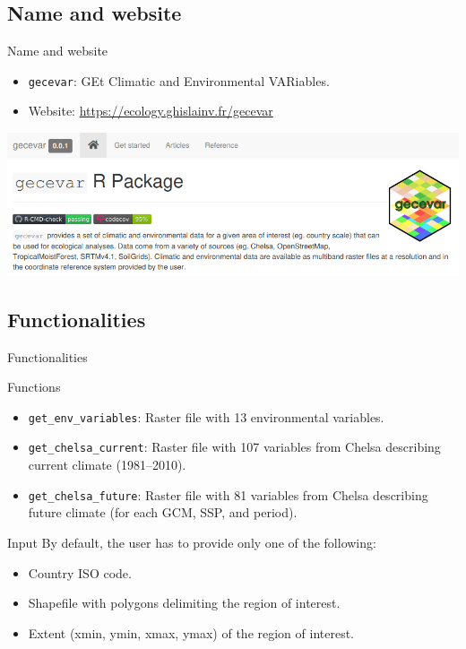\documentclass[10pt,table,dvipsnames,compress]{beamer}
\begin{document}
\subsection{Name and website}
\label{sec:orgb40b0ad}

\begin{frame}[label={sec:orgeaef01e},fragile]{Name and website}
 \begin{itemize}
\item \texttt{gecevar}: GEt Climatic and Environmental VARiables.
\item Website: \url{https://ecology.ghislainv.fr/gecevar}
\end{itemize}

\begin{center}
\includegraphics[width=\textwidth]{figs/gecevar-website.png}
\end{center}
\end{frame}

\subsection{Functionalities}
\label{sec:org6fc9dc9}

\begin{frame}[label={sec:org66afcc2},fragile]{Functionalities}
 \begin{block}{Functions}
\begin{itemize}
\item \texttt{get\_env\_variables}: Raster file with 13 environmental variables.
\item \texttt{get\_chelsa\_current}: Raster file with 107 variables from Chelsa describing current climate (1981--2010).
\item \texttt{get\_chelsa\_future}: Raster file with 81 variables from Chelsa describing future climate (for each GCM, SSP, and period).
\end{itemize}
\end{block}

\begin{block}{Input}
By default, the user has to provide only one of the following:
\begin{itemize}
\item Country ISO code.
\item Shapefile with polygons delimiting the region of interest.
\item Extent (xmin, ymin, xmax, ymax) of the region of interest.
\end{itemize}
\end{block}
\end{frame}
\end{document}
